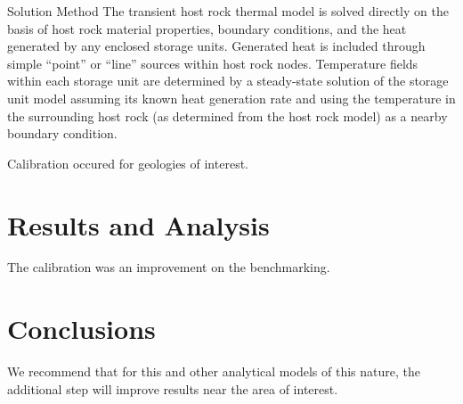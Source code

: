 \documentclass{anstrans}
\begin{document}
Solution Method
The transient host rock thermal model is solved directly on the basis of host 
rock material properties, boundary conditions, and the heat generated by any 
enclosed storage units. Generated heat is included through simple “point” or 
“line” sources within host rock nodes.  Temperature fields within each storage 
unit are determined by a steady-state solution of the storage unit model 
assuming its known heat generation rate and using the temperature in the 
surrounding host rock (as determined from the host rock model) as a nearby 
boundary condition. 

Calibration occured for geologies of interest.  


\section{Results and Analysis}

The calibration was an improvement on the benchmarking.

\section{Conclusions}

We recommend that for this and other analytical models of this nature, the 
additional step will improve results near the area of interest.



\end{document}
